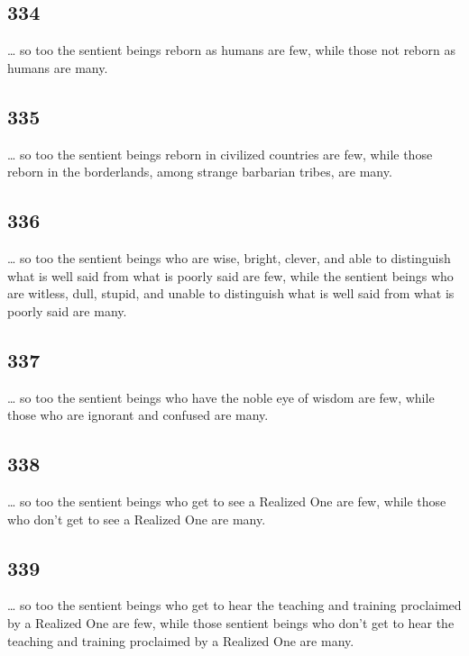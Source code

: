 \documentclass[12pt,openany]{book}%
\begin{document}
\subsection*{334 }

… so too the sentient beings reborn as humans are few, while those not reborn as humans are many. 

\subsection*{335 }

… so too the sentient beings reborn in civilized countries are few, while those reborn in the borderlands, among strange barbarian tribes, are many. 

\subsection*{336 }

… so too the sentient beings who are wise, bright, clever, and able to distinguish what is well said from what is poorly said are few, while the sentient beings who are witless, dull, stupid, and unable to distinguish what is well said from what is poorly said are many. 

\subsection*{337 }

… so too the sentient beings who have the noble eye of wisdom are few, while those who are ignorant and confused are many. 

\subsection*{338 }

… so too the sentient beings who get to see a Realized One are few, while those who don’t get to see a Realized One are many. 

\subsection*{339 }

… so too the sentient beings who get to hear the teaching and training proclaimed by a Realized One are few, while those sentient beings who don’t get to hear the teaching and training proclaimed by a Realized One are many. 
\end{document}
